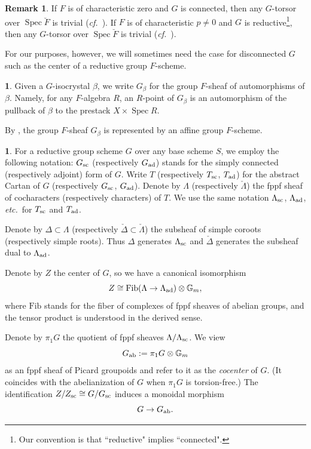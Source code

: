 \documentclass[10pt,english,reqno]{amsart}
\newcommand{\Fib}{\mathrm{Fib}}
\newcommand{\Spec}{\operatorname{Spec}}
\newcommand{\sconn}{\textnormal{sc}}
\newcommand{\adjoint}{\textnormal{ad}}
\newcommand{\abelian}{\textnormal{ab}}
\theoremstyle{definition}
\newtheorem{rem}[subsubsection]{Remark}
\numberwithin{equation}{section}
\newtheorem{untitledsubsubsection}[subsubsection]{}
\newenvironment{void}
{\begin{untitledsubsubsection}}
{\end{untitledsubsubsection}}
\begin{document}

\begin{rem}
\label{rem-isocrystal-conjugacy-class}
If $F$ is of characteristic zero and $G$ is connected, then any $G$-torsor over $\Spec\breve F$ is trivial (\emph{cf.}~\cite[Theorem 1.9]{MR180554}). If $F$ is of characteristic $p\neq 0$ and $G$ is reductive\footnote{Our convention is that ``reductive" implies ``connected".}, then any $G$-torsor over $\Spec\breve F$ is trivial (\emph{cf.}~\cite[\S8.6]{MR244259}).

For our purposes, however, we will sometimes need the case for disconnected $G$ such as the center of a reductive group $F$-scheme.
\end{rem}


\begin{void}
Given a $G$-isocrystal $\beta$, we write $G_{\beta}$ for the group $F$-sheaf of automorphisms of $\beta$. Namely, for any $F$-algebra $R$, an $R$-point of $G_{\beta}$ is an automorphism of the pullback of $\beta$ to the prestack $X\times\Spec R$.

By \cite[\S3.3]{MR1485921}, the group $F$-sheaf $G_{\beta}$ is represented by an affine group $F$-scheme.
\end{void}


\begin{void}
\label{void-reductive-group-notation}
For a reductive group scheme $G$ over any base scheme $S$, we employ the following notation: $G_{\sconn}$ (respectively $G_{\adjoint}$) stands for the simply connected (respectively adjoint) form of $G$. Write $T$ (respectively $T_{\sconn}$, $T_{\adjoint}$) for the abstract Cartan of $G$ (respectively $G_{\sconn}$, $G_{\adjoint}$). Denote by $\Lambda$ (respectively $\check{\Lambda}$) the fppf sheaf of cocharacters (respectively characters) of $T$. We use the same notation $\Lambda_{\sconn}$, $\Lambda_{\adjoint}$, \emph{etc.}~for $T_{\sconn}$ and $T_{\adjoint}$.

Denote by $\Delta \subset \Lambda$ (respectively $\check{\Delta} \subset \check{\Lambda}$) the subsheaf of simple coroots (respectively simple roots). Thus $\Delta$ generates $\Lambda_{\sconn}$ and $\check{\Delta}$ generates the subsheaf dual to $\Lambda_{\adjoint}$.

Denote by $Z$ the center of $G$, so we have a canonical isomorphism
$$
Z \cong \Fib(\Lambda \rightarrow \Lambda_{\adjoint}) \otimes \mathbb G_m,
$$
where $\Fib$ stands for the fiber of complexes of fppf sheaves of abelian groups, and the tensor product is understood in the derived sense.

Denote by $\pi_1 G$ the quotient of fppf sheaves $\Lambda/\Lambda_{\sconn}$. We view
$$
G_{\abelian} := \pi_1 G\otimes \mathbb G_m
$$
as an fppf sheaf of Picard groupoids and refer to it as the \emph{cocenter} of $G$. (It coincides with the abelianization of $G$ when $\pi_1 G$ is torsion-free.) The identification $Z/Z_{\sconn}\cong G/G_{\sconn}$ induces a monoidal morphism
\begin{equation}
\label{eq-group-scheme-cocenter}
G \rightarrow G_{\abelian}.
\end{equation}
\end{void}
\end{document}
